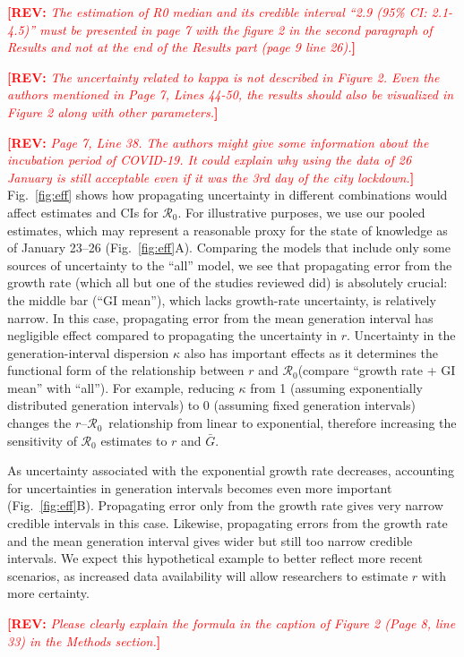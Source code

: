 \documentclass[12pt]{article}
\newcommand{\fref}[1]{Fig.~\ref{fig:#1}}
\newcommand{\Ro}{\ensuremath{{\mathcal R}_{0}}\xspace}
\newcommand{\comment}[3]{\textcolor{#1}{\textbf{[#2: }\textsl{#3}\textbf{]}}}
\newcommand{\rev}[1]{\comment{red}{REV}{#1}}
\begin{document}
\rev{The estimation of R0 median and its credible interval “2.9 (95\% CI: 2.1-4.5)” must be presented
in page 7 with the figure 2 in the second paragraph of Results and not at the end of the Results
part (page 9 line 26).}

\rev{The uncertainty related to kappa is not described in Figure 2. Even the authors mentioned in
Page 7, Lines 44-50, the results should also be visualized in Figure 2 along with other
parameters.}

\rev{Page 7, Line 38. The authors might give some information about the incubation period of
COVID-19. It could explain why using the data of 26 January is still acceptable even if it was the
3rd day of the city lockdown.}
\fref{eff} shows how propagating uncertainty in different combinations would affect estimates and CIs for \Ro. For illustrative purposes, we use our pooled estimates, which may represent a reasonable proxy for the state of knowledge as of January 23--26 (\fref{eff}A).
Comparing the models that include only some sources of uncertainty to the ``all'' model, we see that propagating error from the growth rate (which all but one of the studies reviewed did) is absolutely crucial: the middle bar (``GI mean''), which lacks growth-rate uncertainty, is relatively narrow.
In this case, propagating error from the mean generation interval has negligible effect compared to propagating the uncertainty in $r$.
Uncertainty in the generation-interval dispersion $\kappa$ also has important effects as it determines the functional form of the relationship between $r$ and \Ro (compare ``growth rate + GI mean'' with ``all'').
For example, reducing $\kappa$ from 1 (assuming exponentially distributed generation intervals) to 0 (assuming fixed generation intervals) changes the $r$--\Ro\ relationship from linear to exponential, therefore increasing the sensitivity of \Ro estimates to $r$ and $\bar G$.

As uncertainty associated with the exponential growth rate decreases, accounting for uncertainties in generation intervals becomes even more important (\fref{eff}B).
Propagating error only from the growth rate gives very narrow credible intervals in this case. 
Likewise, propagating errors from the growth rate and the mean generation interval gives wider but still too narrow credible intervals.
We expect this hypothetical example to better reflect more recent scenarios, as increased data availability will allow researchers to estimate $r$ with more certainty.

\rev{Please clearly explain the formula in the caption of Figure 2 (Page 8, line 33) in the Methods
section.}
\end{document}
